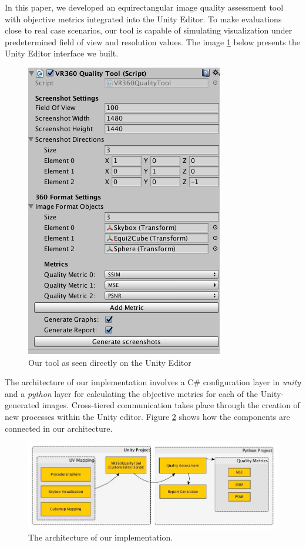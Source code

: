 \documentclass[12pt]{article}
\begin{document}
In this paper, we developed an equirectangular image quality assessment tool with objective metrics integrated into the Unity Editor. To make evaluations close to real case scenarios, our tool is capable of simulating visualization under predetermined field of view and resolution values. The image \ref{fig:tool} below presents the Unity Editor interface we built. 

\begin{figure}
    \centering
    \includegraphics{images/tool.png}
    \caption{Our tool as seen directly on the Unity Editor}
    \label{fig:tool}
\end{figure}

The architecture of our implementation involves a C\# configuration layer in \textit{unity} and a \textit{python} layer for calculating the objective metrics for each of the Unity-generated images. Cross-tiered communication takes place through the creation of new processes within the Unity editor. Figure \ref{fig:toolarch} shows how the components are connected in our architecture.

\begin{figure}[ht]
\centering
\includegraphics[width=\textwidth]{images/tool_arch_en.jpg}
\caption{The architecture of our implementation.}
\label{fig:toolarch}
\end{figure}
\end{document}
